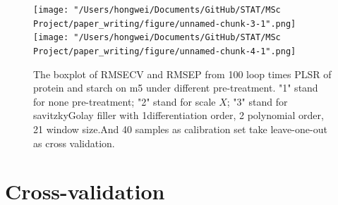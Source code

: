 \documentclass[a4paper,12pt,titlepage]{article} %
\numberwithin{equation}{section}  %
\begin{document}
\begin{appendices}
			\begin{figure}[h]    %
	\centering           %
	\texttt{[image: "/Users/hongwei/Documents/GitHub/STAT/MSc Project/paper\_writing/figure/unnamed-chunk-3-1".png]}  %
	\texttt{[image: "/Users/hongwei/Documents/GitHub/STAT/MSc Project/paper\_writing/figure/unnamed-chunk-4-1".png]}  %
	\caption{The boxplot of RMSECV and RMSEP from 100 loop times PLSR of protein and starch on m5 under different pre-treatment. "1" stand for none pre-treatment; "2" stand for scale $X$; "3" stand for savitzkyGolay filler with 1differentiation order, 2 polynomial order, 21 window size.And 40 samples as calibration set take leave-one-out as cross validation.}          %
	\label{fig:pre-treatment-3-1}               %
\end{figure}                        %


		\clearpage
		\section{Cross-validation}
		
	\end{appendices}
\end{document}
